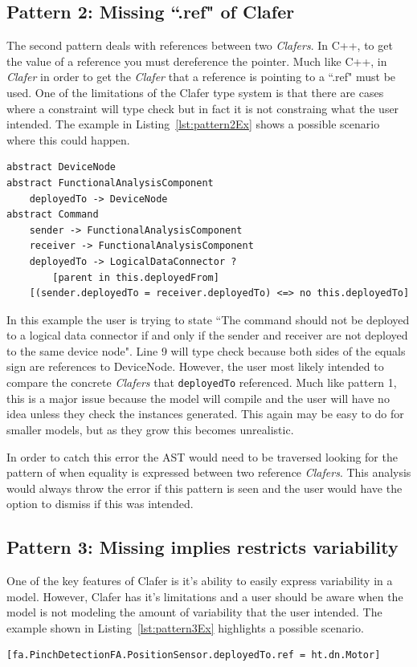 \documentclass[10pt,oneside]{IEEEtran}
\begin{document}
\subsection{Pattern 2: Missing ``.ref" of Clafer}
The second pattern deals with references between two \textit{Clafers}. In C++, to get the value of a reference you must dereference the pointer. Much like C++, in \textit{Clafer} in order to get the \textit{Clafer} that a reference is pointing to a ``.ref" must be used. One of the limitations of the Clafer type system is that there are cases where a constraint will type check but in fact it is not constraing what the user intended. The example in Listing~\ref{lst:pattern2Ex} shows a possible scenario where this could happen.
\begin{lstlisting}[label={lst:pattern2Ex},caption={Example of Pattern 2},numbers=right]
abstract DeviceNode
abstract FunctionalAnalysisComponent
    deployedTo -> DeviceNode
abstract Command
    sender -> FunctionalAnalysisComponent
    receiver -> FunctionalAnalysisComponent
    deployedTo -> LogicalDataConnector ?
        [parent in this.deployedFrom]
    [(sender.deployedTo = receiver.deployedTo) <=> no this.deployedTo]
\end{lstlisting}

In this example the user is trying to state ``The command should not be deployed to a logical data connector if and only if the sender and receiver are not deployed to the same device node". Line 9 will type check because both sides of the equals sign are references to DeviceNode. However, the user most likely intended to compare the concrete \textit{Clafers} that \lstinline$deployedTo$ referenced. Much like pattern 1, this is a major issue because the model will compile and the user will have no idea unless they check the instances generated. This again may be easy to do for smaller models, but as they grow this becomes unrealistic.

In order to catch this error the AST would need to be traversed looking for the pattern of when equality is expressed between two reference \textit{Clafers}. This analysis would always throw the error if this pattern is seen and the user would have the option to dismiss if this was intended.
\subsection{Pattern 3: Missing implies restricts variability}
One of the key features of Clafer is it's ability to easily express variability in a model. However, Clafer has it's limitations and a user should be aware when the model is not modeling the amount of variability that the user intended. The example shown in Listing~\ref{lst:pattern3Ex} highlights a possible scenario.
\begin{lstlisting}[label={lst:pattern3Ex},caption={Example of Pattern 3}]
[fa.PinchDetectionFA.PositionSensor.deployedTo.ref = ht.dn.Motor]
\end{lstlisting}
\end{document}
